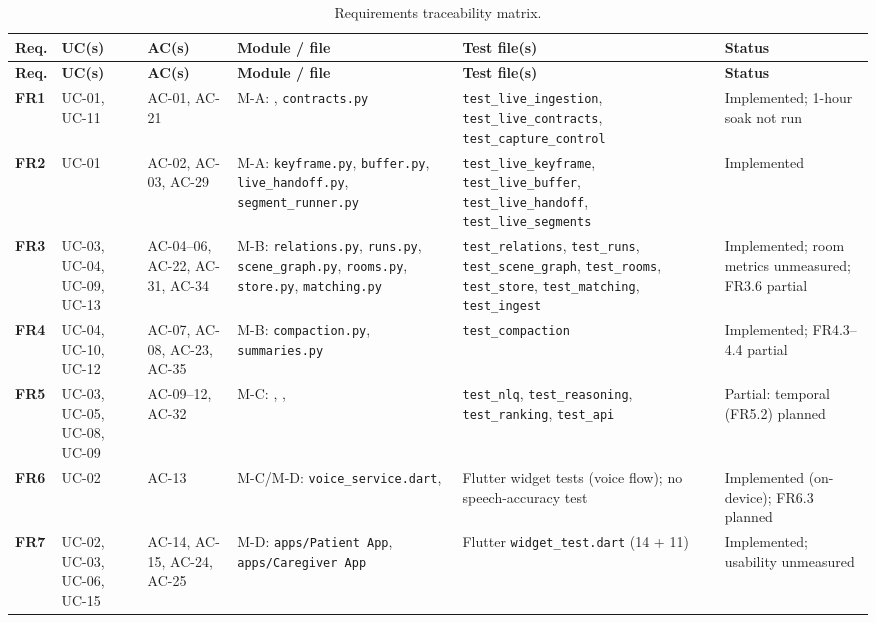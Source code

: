 \begin{ltab}
\scriptsize
\begin{longtable}{@{}>{\bfseries}L{0.9cm}L{1.6cm}L{1.9cm}L{3.3cm}L{3.5cm}L{2.6cm}@{}}
\caption{Requirements traceability matrix.}\label{tab:trace}\\
\toprule
{}\textbf{Req.} & \textbf{UC(s)} & \textbf{AC(s)} & \textbf{Module / file} & \textbf{Test file(s)} & \textbf{Status}\\
\midrule
\endfirsthead
\toprule
{}\textbf{Req.} & \textbf{UC(s)} & \textbf{AC(s)} & \textbf{Module / file} & \textbf{Test file(s)} & \textbf{Status}\\
\midrule
\endhead
\bottomrule
\endfoot
FR1 & UC-01, UC-11 & AC-01, AC-21 & M-A: , \texttt{contracts.py} & \texttt{test\_live\_ingestion}, \texttt{test\_live\_contracts}, \texttt{test\_capture\_control} & Implemented; 1-hour soak not run\\
FR2 & UC-01 & AC-02, AC-03, AC-29 & M-A: \texttt{keyframe.py}, \texttt{buffer.py}, \texttt{live\_handoff.py}, \texttt{segment\_runner.py} & \texttt{test\_live\_keyframe}, \texttt{test\_live\_buffer}, \texttt{test\_live\_handoff}, \texttt{test\_live\_segments} & Implemented\\
FR3 & UC-03, UC-04, UC-09, UC-13 & AC-04--06, AC-22, AC-31, AC-34 & M-B: \texttt{relations.py}, \texttt{runs.py}, \texttt{scene\_graph.py}, \texttt{rooms.py}, \texttt{store.py}, \texttt{matching.py} & \texttt{test\_relations}, \texttt{test\_runs}, \texttt{test\_scene\_graph}, \texttt{test\_rooms}, \texttt{test\_store}, \texttt{test\_matching}, \texttt{test\_ingest} & Implemented; room metrics unmeasured; FR3.6 partial\\
FR4 & UC-04, UC-10, UC-12 & AC-07, AC-08, AC-23, AC-35 & M-B: \texttt{compaction.py}, \texttt{summaries.py} & \texttt{test\_compaction} & Implemented; FR4.3--4.4 partial\\
FR5 & UC-03, UC-05, UC-08, UC-09 & AC-09--12, AC-32 & M-C: , ,  & \texttt{test\_nlq}, \texttt{test\_reasoning}, \texttt{test\_ranking}, \texttt{test\_api} & Partial: temporal (FR5.2) planned\\
FR6 & UC-02 & AC-13 & M-C/M-D: \texttt{voice\_service.dart},  & Flutter widget tests (voice flow); no speech-accuracy test & Implemented (on-device); FR6.3 planned\\
FR7 & UC-02, UC-03, UC-06, UC-15 & AC-14, AC-15, AC-24, AC-25 & M-D: \texttt{apps/Patient App}, \texttt{apps/Caregiver App} & Flutter \texttt{widget\_test.dart} (14 + 11) & Implemented; usability unmeasured\\

\end{longtable}
\end{ltab}
